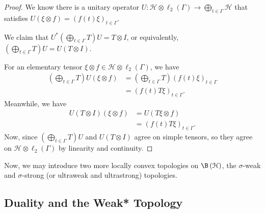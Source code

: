\documentclass[10pt]{mypackage}
\begin{document}
\begin{proof}
  We know there is a unitary operator $U\colon \mathcal{H}\otimes \ell_2\left( \Gamma \right)\rightarrow \bigoplus_{t\in\Gamma}\mathcal{H}$ that satisfies $U\left( \xi\otimes f \right) = \left( f(t)\xi \right)_{t\in\Gamma}$.\newline

  We claim that $U^{\ast}\left( \bigoplus_{t\in\Gamma} T \right)U = T\otimes I$, or equivalently, $\left( \bigoplus_{t\in\Gamma}T \right)U = U\left( T\otimes I \right)$.\newline

  For an elementary tensor $\xi\otimes f\in \mathcal{H}\otimes \ell_2\left( \Gamma \right)$, we have
  \begin{align*}
    \left( \bigoplus_{t\in\Gamma} T \right)U \left( \xi\otimes f \right) &= \left( \bigoplus_{t\in\Gamma} T \right)\left( f(t)\xi \right)_{t\in\Gamma}\\
                                                                         &= \left( f(t)T\xi \right)_{t\in\Gamma}.
  \end{align*}
  Meanwhile, we have
  \begin{align*}
    U\left( T\otimes I \right)\left( \xi\otimes f \right) &= U\left( T\xi\otimes f \right)\\
                                                          &= \left( f(t)T\xi \right)_{t\in\Gamma}.
  \end{align*}
  Now, since $\left( \bigoplus_{t\in\Gamma} T \right) U $ and $U\left( T\otimes I \right)$ agree on simple tensors, so they agree on $\mathcal{H}\otimes \ell_2\left( \Gamma \right)$ by linearity and continuity.
\end{proof}
Now, we may introduce two more locally convex topologies on $\B\left( \mathcal{H} \right)$, the $\sigma$-weak and $\sigma$-strong (or ultraweak and ultrastrong) topologies.
\subsection{Duality and the Weak* Topology}%
\end{document}
